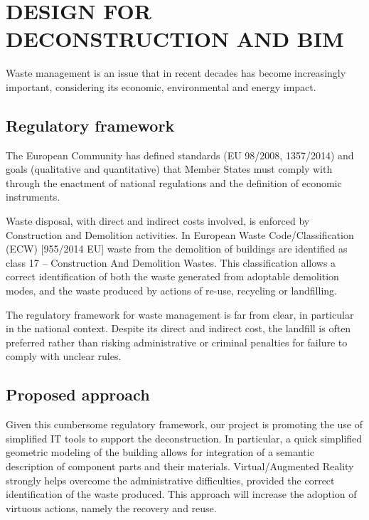 \section{\uppercase{Design for Deconstruction and BIM}}
\label{sec:deconstruction}

\noindent
Waste management is an issue that in recent decades has become increasingly important, considering its economic, environmental and energy  impact.

\vspace{-3mm}\subsection{Regulatory framework}\vspace{-3mm}
\label{sec:CER}

The European Community has defined standards (EU 98/2008, 1357/2014) and goals (qualitative and quantitative) that Member States must comply with through the enactment of national regulations and the definition of economic instruments.

Waste disposal, with direct and indirect costs involved, is enforced by Construction and Demolition activities. In European Waste Code/Classification (ECW) [955/2014 EU] waste from the demolition of buildings are identified as class 17 -- Construction And Demolition Wastes. 
This classification allows a correct identification of both the waste generated from adoptable demolition modes, and the waste produced by actions of re-use, recycling or landfilling.
 
The regulatory framework for waste management is far from clear, in particular in the national context. Despite its direct and indirect cost, the landfill is often preferred rather than risking administrative or criminal penalties for failure to comply with unclear rules.  

\vspace{-3mm}\subsection{Proposed approach}\vspace{-3mm}

Given this cumbersome regulatory framework, our project is promoting the use of simplified IT tools to support the deconstruction. In particular, a quick simplified geometric modeling of the building allows for integration of a semantic description of component parts and their materials. Virtual/Augmented Reality  strongly helps overcome the administrative difficulties, provided the correct identification of the waste produced.
This approach will increase the adoption of virtuous actions, namely the recovery and reuse.

